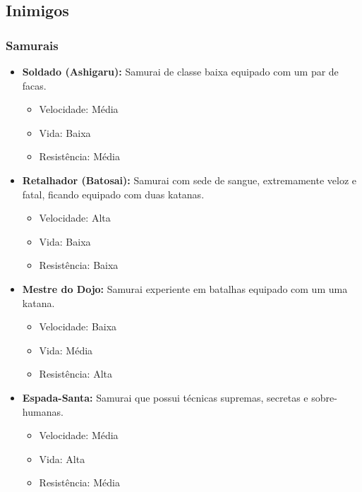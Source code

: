 \documentclass[10pt,a4paper]{article}
\begin{document}
\subsection{Inimigos}
\subsubsection{Samurais}
\begin{itemize}
\item \textbf{Soldado (Ashigaru):} Samurai de classe baixa equipado com um par de facas.
	\begin{itemize}
	\item Velocidade: Média
	\item Vida: Baixa
	\item Resistência: Média
	\end{itemize}
\item \textbf{Retalhador (Batosai):} Samurai com sede de sangue, extremamente veloz e fatal, ficando equipado com duas katanas.
	\begin{itemize}
	\item Velocidade: Alta
	\item Vida: Baixa
	\item Resistência: Baixa
	\end{itemize}
\item \textbf{Mestre do Dojo:} Samurai experiente em batalhas equipado com um uma katana.
	\begin{itemize}
	\item Velocidade: Baixa
	\item Vida: Média
	\item Resistência: Alta
	\end{itemize}
\item \textbf{Espada-Santa:} Samurai que possui técnicas supremas, secretas e sobre-humanas.
	\begin{itemize}
	\item Velocidade: Média
	\item Vida: Alta
	\item Resistência: Média
	\end{itemize}
\end{itemize}
\end{document}
